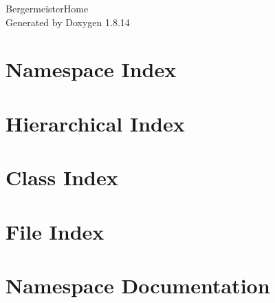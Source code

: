 \documentclass[twoside]{book}
\newcommand{\+}{\discretionary{\mbox{\scriptsize$\hookleftarrow$}}{}{}}
\newcommand{\clearemptydoublepage}{%
  \newpage{\pagestyle{empty}\cleardoublepage}%
}
\begin{document}
\hypersetup{pageanchor=false,
             bookmarksnumbered=true,
             pdfencoding=unicode
            }
\begin{titlepage}
\vspace*{7cm}
\begin{center}%
{\Large Bergermeister\+Home }\\
\vspace*{1cm}
{\large Generated by Doxygen 1.8.14}\\
\end{center}
\end{titlepage}
\clearemptydoublepage
{}
\tableofcontents
\clearemptydoublepage
{}
\hypersetup{pageanchor=true}

\chapter{Namespace Index}

\chapter{Hierarchical Index}

\chapter{Class Index}

\chapter{File Index}

\chapter{Namespace Documentation}

\end{document}
